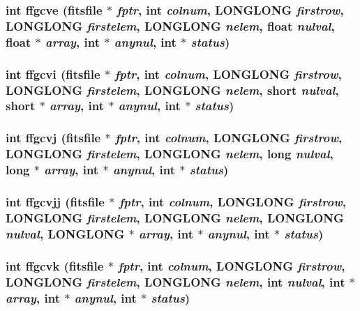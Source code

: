\subsubsection{\setlength{\rightskip}{0pt plus 5cm}int ffgcve (\bf{fitsfile} $\ast$ {\em fptr}, int {\em colnum}, \bf{LONGLONG} {\em firstrow}, \bf{LONGLONG} {\em firstelem}, \bf{LONGLONG} {\em nelem}, float {\em nulval}, float $\ast$ {\em array}, int $\ast$ {\em anynul}, int $\ast$ {\em status})}\label{fitsio_8h_66537a8f5d81daef1031af6e56dfb68d}


\subsubsection{\setlength{\rightskip}{0pt plus 5cm}int ffgcvi (\bf{fitsfile} $\ast$ {\em fptr}, int {\em colnum}, \bf{LONGLONG} {\em firstrow}, \bf{LONGLONG} {\em firstelem}, \bf{LONGLONG} {\em nelem}, short {\em nulval}, short $\ast$ {\em array}, int $\ast$ {\em anynul}, int $\ast$ {\em status})}\label{fitsio_8h_3c75d5377fd8e2ad2df15494ff2a2825}


\subsubsection{\setlength{\rightskip}{0pt plus 5cm}int ffgcvj (\bf{fitsfile} $\ast$ {\em fptr}, int {\em colnum}, \bf{LONGLONG} {\em firstrow}, \bf{LONGLONG} {\em firstelem}, \bf{LONGLONG} {\em nelem}, long {\em nulval}, long $\ast$ {\em array}, int $\ast$ {\em anynul}, int $\ast$ {\em status})}\label{fitsio_8h_3e834544d66dd18b076a540fe0b76b71}


\subsubsection{\setlength{\rightskip}{0pt plus 5cm}int ffgcvjj (\bf{fitsfile} $\ast$ {\em fptr}, int {\em colnum}, \bf{LONGLONG} {\em firstrow}, \bf{LONGLONG} {\em firstelem}, \bf{LONGLONG} {\em nelem}, \bf{LONGLONG} {\em nulval}, \bf{LONGLONG} $\ast$ {\em array}, int $\ast$ {\em anynul}, int $\ast$ {\em status})}\label{fitsio_8h_3ff4e550740bd56040b55dfa1774f735}


\subsubsection{\setlength{\rightskip}{0pt plus 5cm}int ffgcvk (\bf{fitsfile} $\ast$ {\em fptr}, int {\em colnum}, \bf{LONGLONG} {\em firstrow}, \bf{LONGLONG} {\em firstelem}, \bf{LONGLONG} {\em nelem}, int {\em nulval}, int $\ast$ {\em array}, int $\ast$ {\em anynul}, int $\ast$ {\em status})}\label{fitsio_8h_5cc43e7f2f0c613cf04b0330ba75ba40}


